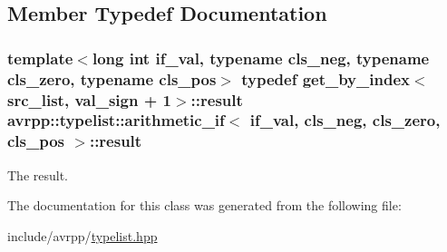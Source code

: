 \subsection{Member Typedef Documentation}
\hypertarget{classavrpp_1_1typelist_1_1arithmetic__if_a02b41945cc22084e2a91956e58366c6a}{
\subsubsection[{result}]{\setlength{\rightskip}{0pt plus 5cm}template$<$long int if\_\-val, typename cls\_\-neg, typename cls\_\-zero, typename cls\_\-pos$>$ typedef get\_\-by\_\-index$<${\bf src\_\-list}, val\_\-sign + 1$>$::{\bf result} {\bf avrpp::typelist::arithmetic\_\-if}$<$ if\_\-val, cls\_\-neg, cls\_\-zero, cls\_\-pos $>$::{\bf result}}}
\label{classavrpp_1_1typelist_1_1arithmetic__if_a02b41945cc22084e2a91956e58366c6a}


The result. 



The documentation for this class was generated from the following file:\begin{DoxyCompactItemize}
\item 
include/avrpp/\hyperlink{typelist_8hpp}{typelist.hpp}\end{DoxyCompactItemize}
